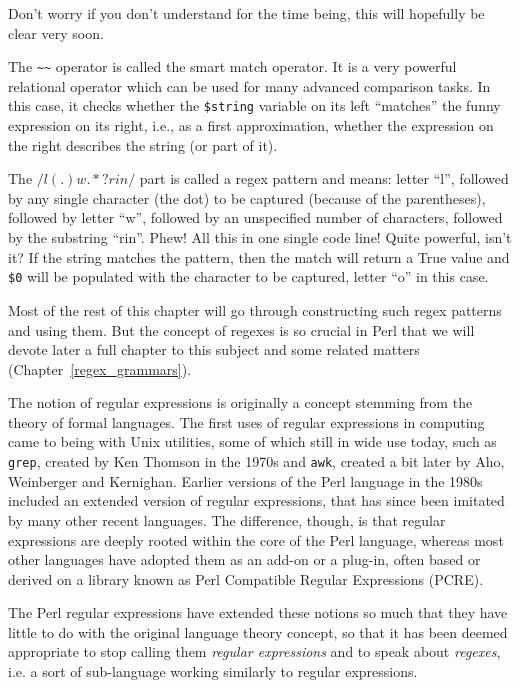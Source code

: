 Don't worry if you don't understand for the time being, this 
will hopefully be clear very soon.

The \verb'~~' operator is called the smart match operator. It is 
a very powerful relational operator which can be used for 
many advanced comparison tasks. In this case, it checks whether 
the {\tt \$string} variable on its left ``matches''  
the funny expression on its right, i.e., as a first 
approximation, whether the expression on the right describes 
the string (or part of it). 

The $/ l (.) w .*? rin /$ part is called a regex pattern and means: 
letter ``l'', followed by any single character (the dot) to be 
captured (because of the parentheses), followed by letter ``w'', 
followed by an unspecified number of characters, followed by the 
substring ``rin''. Phew! All this in one single code line! Quite 
powerful, isn't it? If the string matches the pattern, then 
the match will return a True value and \verb'$0' will be 
populated with the character to be captured, letter ``o'' 
in this case.

Most of the rest of this chapter will go through constructing 
such regex patterns and using them. But the concept of 
regexes is so crucial in Perl that we will devote later a full 
chapter to this subject and some related matters (Chapter~\ref{regex_grammars}).

The notion of regular expressions is originally a concept 
stemming from the theory of formal languages. The first 
uses of regular expressions in computing came to being 
with Unix utilities, some of which still in wide use today, such as 
{\tt grep}, created by Ken Thomson in the 1970s and 
{\tt awk}, created a bit later by Aho, Weinberger and Kernighan. 
Earlier versions of the Perl language in the 1980s included an 
extended version of regular expressions, that has since 
been imitated by many other recent languages. The difference, 
though, is that regular expressions are deeply rooted within the 
core of the Perl language, whereas most other languages have 
adopted them as an add-on or a plug-in, often based or derived 
on a library known as Perl Compatible Regular Expressions (PCRE).

The Perl regular expressions have extended these notions 
so much that they have little to do with the original 
language theory concept, so that 
it has been deemed appropriate to stop calling them 
\emph{regular expressions} and to speak about \emph{regexes}, 
i.e. a sort of sub-language working similarly to regular 
expressions.

